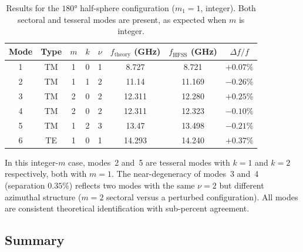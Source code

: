 \documentclass[
  aip,
  amsmath,amssymb,
  preprint
]{revtex4-1}
\begin{document}
\begin{table}[htbp]
\centering
\caption{Results for the $180°$ half-sphere configuration ($m_1 = 1$, integer). Both sectoral and tesseral modes are present, as expected when $m$ is integer.}
\label{tab:integer_results}
\begin{tabular}{cccccccc}
\hline
Mode & Type & $m$ & $k$ & $\nu$ & $f_{\mathrm{theory}}$ (GHz) & $f_{\mathrm{HFSS}}$ (GHz) & $\Delta f/f$ \\
\hline
1 & TM & 1 & 0 & 1 & 8.727 & 8.721 & $+0.07\%$ \\
2 & TM & 1 & 1 & 2 & 11.14 & 11.169 & $-0.26\%$ \\
3 & TM & 2 & 0 & 2 & 12.311 & 12.280 & $+0.25\%$ \\
4 & TM & 2 & 0 & 2 & 12.311 & 12.323 & $-0.10\%$ \\
5 & TM & 1 & 2 & 3 & 13.47 & 13.498 & $-0.21\%$ \\
6 & TE & 1 & 0 & 1 & 14.293 & 14.240 & $+0.37\%$ \\
\hline
\end{tabular}
\end{table}
In this integer-$m$ case, modes~2 and~5 are tesseral modes with $k = 1$ and $k = 2$ respectively, both with $m = 1$. The near-degeneracy of modes~3 and~4 (separation $0.35\%$) reflects two modes with the same $\nu = 2$ but different azimuthal structure ($m = 2$ sectoral versus a perturbed configuration). All modes are consistent theoretical identification with sub-percent agreement.

\subsection{Summary}
\end{document}
